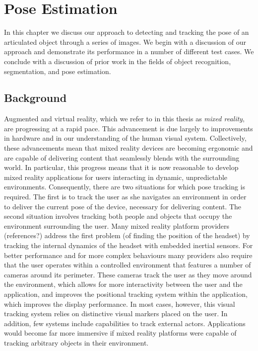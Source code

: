 \chapter{Pose Estimation}
\label{poseEstimation}

In this chapter we discuss our approach to detecting and tracking the pose of an articulated object through a series of images. We begin with a discussion of our approach and demonstrate its performance in a number of different test cases. We conclude with a discussion of prior work in the fields of object recognition, segmentation, and pose estimation. 

\section{Background}

Augmented and virtual reality, which we refer to in this thesis as \textit{mixed reality}, are progressing at a rapid pace. This advancement is due largely to improvements in hardware and in our understanding of the human visual system. Collectively, these advancements mean that mixed reality devices are becoming ergonomic and are capable of delivering content that seamlessly blends with the surrounding world. In particular, this progress means that it is now reasonable to develop mixed reality applications for users interacting in dynamic, unpredictable environments. Consequently, there are two situations for which pose tracking is required. The first is to track the user as she navigates an environment in order to deliver the current pose of the device, necessary for delivering content. The second situation involves tracking both people and objects that occupy the environment surrounding the user. Many mixed reality platform providers (references?) address the first problem (of finding the position of the headset) by tracking the internal dynamics of the headset with embedded inertial sensors. For better performance and for more complex behaviours many providers also require that the user operates within a controlled environment that features a number of cameras around its perimeter. These cameras track the user as they move around the environment, which allows for more interactivity between the user and the application, and improves the positional tracking system within the application, which improves the display performance. In most cases, however, this visual tracking system relies on distinctive visual markers placed on the user. In addition, few systems include capabilities to track external actors. Applications would become far more immersive if mixed reality platforms were capable of tracking arbitrary objects in their environment. 

